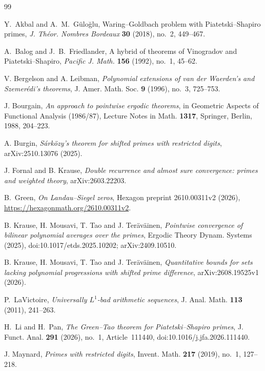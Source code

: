 \documentclass[12pt]{amsart}
\newcommand{\1}{\mathbf 1}
\begin{document}
\begin{thebibliography}{99}
\raggedright

Y.~Akbal and A.~M.~G\"ulo\u{g}lu,
Waring--Goldbach problem with Piatetski--Shapiro primes,
\emph{J. Th\'eor. Nombres Bordeaux} \textbf{30} (2018),
no.~2, 449--467.


A.~Balog and J.~B.~Friedlander,
A hybrid of theorems of Vinogradov and Piatetski--Shapiro,
\emph{Pacific J. Math.} \textbf{156} (1992), no.~1, 45--62.

V. Bergelson and A. Leibman,
\emph{Polynomial extensions of van der Waerden's and Szemer\'edi's
theorems},
J. Amer. Math. Soc. \textbf{9} (1996), no.~3, 725--753.

J. Bourgain,
\emph{An approach to pointwise ergodic theorems},
in Geometric Aspects of Functional Analysis (1986/87),
Lecture Notes in Math. \textbf{1317},
Springer, Berlin, 1988, 204--223.

A. Burgin,
\emph{S\'ark\"ozy's theorem for shifted primes with restricted digits},
arXiv:2510.13076 (2025).

J. Fornal and B. Krause,
\emph{Double recurrence and almost sure convergence:
primes and weighted theory},
arXiv:2603.22203.

B.~Green,
\emph{On Landau--Siegel zeros},
Hexagon preprint 2610.00311v2 (2026),
\url{https://hexagonmath.org/2610.00311v2}.

B. Krause, H. Mousavi, T. Tao and J. Ter\"av\"ainen,
\emph{Pointwise convergence of bilinear polynomial averages over the primes},
Ergodic Theory Dynam. Systems (2025),
doi:10.1017/etds.2025.10202; arXiv:2409.10510.


B. Krause, H. Mousavi, T. Tao and J. Ter\"av\"ainen,
\emph{Quantitative bounds for sets lacking polynomial progressions with
shifted prime difference},
arXiv:2608.19525v1 (2026).

P.~LaVictoire,
\emph{Universally $L^1$-bad arithmetic sequences},
J. Anal. Math. \textbf{113} (2011), 241--263.

H.~Li and H.~Pan,
\emph{The Green--Tao theorem for Piatetski--Shapiro primes},
J. Funct. Anal. \textbf{291} (2026), no.~1,
Article~111440, doi:10.1016/j.jfa.2026.111440.


J. Maynard,
\emph{Primes with restricted digits},
Invent. Math. \textbf{217} (2019), no.~1, 127--218.



\end{thebibliography}
\end{document}
